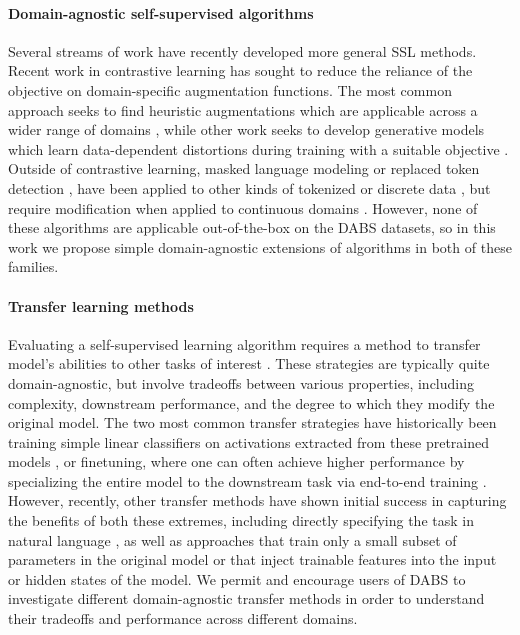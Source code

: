 \documentclass{article}
\begin{document}
\paragraph{Domain-agnostic self-supervised algorithms}
Several streams of work have recently developed more general SSL methods. Recent work in contrastive learning has sought to reduce the reliance of the objective on domain-specific augmentation functions. The most common approach seeks to find heuristic augmentations which are applicable across a wider range of domains \citep{Lee2021iMIXAD, Verma2020TowardsDC, You2020GraphCL}, while other work seeks to develop generative models which learn data-dependent distortions during training with a suitable objective \citep{Tamkin2020ViewmakerNL}. Outside of contrastive learning, masked language modeling \citep{Devlin2019BERTPO} or replaced token detection \citep{Clark2020ELECTRAPT}, have been applied to other kinds of tokenized or discrete data \citep{Iida2021TABBIEPR, Hu2020StrategiesFP, Choromanski2020MaskedLM}, but require modification when applied to continuous domains \citep{Dosovitskiy2020AnII, Liu2020MockingjayUS}. However, none of these algorithms are applicable out-of-the-box on the DABS datasets, so in this work we propose simple domain-agnostic extensions of algorithms in both of these families. 

\paragraph{Transfer learning methods} Evaluating a self-supervised learning algorithm requires a method to transfer model's abilities to other tasks of interest \citep{AbuMostafa1990LearningFH, Caruana1994LearningMR, Bengio2012DeepLO}. These strategies are typically quite domain-agnostic, but involve tradeoffs between various properties, including complexity, downstream performance, and the degree to which they modify the original model. The two most common transfer strategies have historically been training simple linear classifiers on activations extracted from these pretrained models \citep{Donahue2014DeCAFAD, McCann2017LearnedIT, Peters2018DeepCW}, or finetuning, where one can often achieve higher performance by specializing the entire model to the downstream task via end-to-end training \citep{Sermanet2013PedestrianDW, Girshick2014RichFH, Radford2018ImprovingLU, Devlin2019BERTPO}. However, recently, other transfer methods have shown initial success in capturing the benefits of both these extremes, including directly specifying the task in natural language \citep{Brown2020LanguageMA}, as well as approaches that train only a small subset of parameters in the original model \citep{Frankle2020TrainingBA, BenZaken2020BitFitSP} or that inject trainable features into the input \citep{Elsayed2019AdversarialRO,Liu2021GPTUT, Lester2021ThePO} or hidden states \citep{Li2021PrefixTuningOC} of the model.
We permit and encourage users of DABS to investigate different domain-agnostic transfer methods in order to understand their tradeoffs and performance across different domains.
\end{document}
